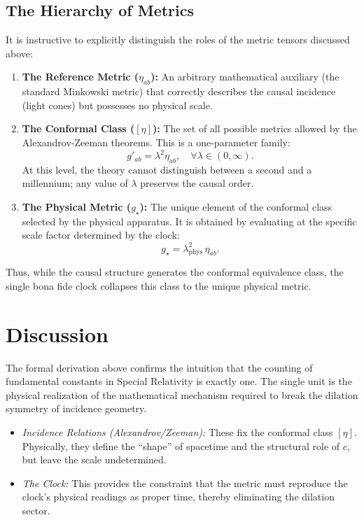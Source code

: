 \documentclass[aps,prd,twocolumn,nofootinbib,superscriptaddress]{revtex4-2}
\begin{document}
\subsection{The Hierarchy of Metrics}

It is instructive to explicitly distinguish the roles of the metric tensors discussed above:

\begin{enumerate}
    \item \textbf{The Reference Metric ($\eta_{ab}$):} An arbitrary mathematical auxiliary (the standard Minkowski metric) that correctly describes the causal incidence (light cones) but possesses no physical scale.

    \item \textbf{The Conformal Class ($[\eta]$):} The set of all possible metrics allowed by the Alexandrov-Zeeman theorems. This is a one-parameter family:
    \begin{equation}
        g'_{ab} = \lambda^2 \eta_{ab}, \quad \forall \lambda \in (0, \infty).
    \end{equation}
    At this level, the theory cannot distinguish between a second and a millennium; any value of $\lambda$ preserves the causal order.

    \item \textbf{The Physical Metric ($g_\star$):} The unique element of the conformal class selected by the physical apparatus. It is obtained by evaluating at the specific scale factor determined by the clock:
    \begin{equation}
        g_\star = \lambda_{\mathrm{phys}}^2 \, \eta_{ab}.
    \end{equation}
\end{enumerate}

Thus, while the causal structure generates the conformal equivalence class, the single bona fide clock collapses this class to the unique physical metric.


\section{Discussion}

The formal derivation above confirms the intuition that the counting of fundamental constants in Special Relativity is exactly one. The single unit is the physical realization of the mathematical mechanism required to break the dilation symmetry of incidence geometry.

\begin{itemize}
    \item \textit{Incidence Relations (Alexandrov/Zeeman):} These fix the conformal class $[\eta]$. Physically, they define the ``shape'' of spacetime and the structural role of $c$, but leave the scale undetermined.
    \item \textit{The Clock:} This provides the constraint that the metric must reproduce the clock's physical readings as proper time, thereby eliminating the dilation sector.
\end{itemize}
\end{document}
